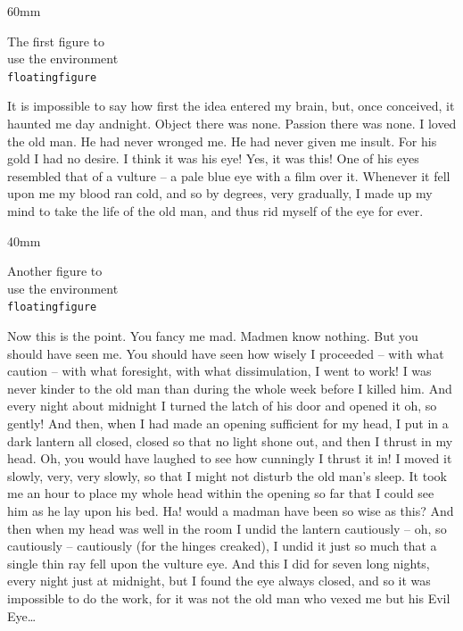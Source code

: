 \begin{floatingfigure}{60mm}
\caption[The \texttt{floatingfigure} environment with \texttt{60mm}]%
        {The \texttt{floatingfigure} environment with \texttt{60mm}
         for \textit{width} and no \textit{option}.}
\label{floatingfigure.1}
\centering %
The first figure to\\ use the environment\\ \texttt{floatingfigure}
\end{floatingfigure}
It is impossible to say how first the idea entered
my brain, but, once conceived, it haunted me day
and\linebreak night. Object there was none. Passion there
was none. I loved the old man. He had never
wronged me. He had never given me insult. For
his gold I had no desire. I think it was his eye!
Yes, it was this! One of his eyes resembled that
of a vulture -- a pale blue eye with a film over it.
Whenever it fell upon me my blood ran cold, and
so by degrees, very gradually, I made up my mind
to take the life of the old man, and thus rid myself
of the eye for ever.

\begin{floatingfigure}[r]{40mm}
\begin{center}
Another figure to\\ use the environment\\ \texttt{floatingfigure}
\end{center}
\caption[The \texttt{floatingfigure} environment with \texttt{40mm}]%
        {The \texttt{floatingfigure} environment with \texttt{40mm}
for \textit{width} and the \texttt{r} \textit{option}.}\label{floatingfigure.2}
\end{floatingfigure}
Now this is the point. You fancy me mad. Madmen
know nothing. But you should have seen me.
You should have seen how wisely I proceeded --
with what caution -- with what foresight, with what
dissimulation, I went to work! I was never kinder
to the old man than during the whole week before
I killed him. And every night about midnight I
turned the latch of his door and opened it oh, so
gently! And then, when I had made an opening
sufficient for my head, I put in a dark lantern all
closed, closed so that no light shone out, and then
I thrust in my head. Oh, you would have laughed
to see how cunningly I thrust it in! I moved it
slowly, very, very slowly, so that I might not
disturb the old man's sleep. It took me an hour to
place my whole head within the opening so far that
I could see him as he lay upon his bed. Ha! would
a madman have been so wise as this? And then
when my head was well in the room I undid the
lantern cautiously -- oh, so cautiously -- cautiously
(for the hinges creaked), I undid it just so much
that a single thin ray fell upon the vulture eye.
And this I did for seven long nights, every night
just at midnight, but I found the eye always closed,
and so it was impossible to do the work, for it was
not the old man who vexed me but his Evil Eye\ldots
\fi

